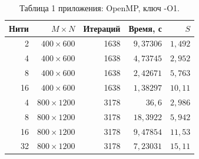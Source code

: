 \begin{table}[H]
\centering\small
\caption{Таблица 1 приложения: OpenMP, ключ -O1.}
\begin{tabular}{rrrrr}
\toprule
Нити & $M\times N$ & Итераций & Время, с & $S$ \\
\midrule
2 & $400\times600$ & 1638 & $9{,}37306$ & $1{,}492$ \\
4 & $400\times600$ & 1638 & $4{,}73745$ & $2{,}952$ \\
8 & $400\times600$ & 1638 & $2{,}42671$ & $5{,}763$ \\
16 & $400\times600$ & 1638 & $1{,}38297$ & $10{,}11$ \\
4 & $800\times1200$ & 3178 & $36{,}6$ & $2{,}986$ \\
8 & $800\times1200$ & 3178 & $18{,}3922$ & $5{,}942$ \\
16 & $800\times1200$ & 3178 & $9{,}47854$ & $11{,}53$ \\
32 & $800\times1200$ & 3178 & $7{,}23031$ & $15{,}11$ \\
\bottomrule
\end{tabular}
\end{table}
